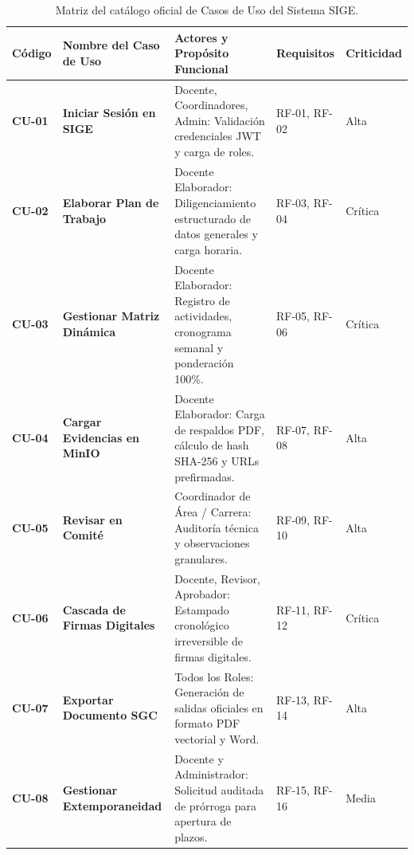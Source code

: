 \documentclass[12pt,a4paper]{article}
\begin{document}
\begin{table}[H]
\centering
\small
\renewcommand{\arraystretch}{1.2}
\begin{tabularx}{\textwidth}{|>{\hsize=0.3\hsize\centering\arraybackslash\footnotesize}X|>{\hsize=1.0\hsize\raggedright\arraybackslash\bfseries\footnotesize}X|>{\hsize=1.8\hsize\raggedright\arraybackslash\footnotesize}X|>{\hsize=0.45\hsize\centering\arraybackslash\footnotesize}X|>{\hsize=0.45\hsize\centering\arraybackslash\footnotesize}X|}
\hline
\rowcolor{tableheader}
\textbf{Código} & \textbf{Nombre del Caso de Uso} & \textbf{Actores y Propósito Funcional} & \textbf{Requisitos} & \textbf{Criticidad} \\
\hline
\textbf{CU-01} & Iniciar Sesión en SIGE & Docente, Coordinadores, Admin: Validación credenciales JWT y carga de roles. & RF-01, RF-02 & Alta \\
\hline
\textbf{CU-02} & Elaborar Plan de Trabajo & Docente Elaborador: Diligenciamiento estructurado de datos generales y carga horaria. & RF-03, RF-04 & Crítica \\
\hline
\textbf{CU-03} & Gestionar Matriz Dinámica & Docente Elaborador: Registro de actividades, cronograma semanal y ponderación 100\%. & RF-05, RF-06 & Crítica \\
\hline
\textbf{CU-04} & Cargar Evidencias en MinIO & Docente Elaborador: Carga de respaldos PDF, cálculo de hash SHA-256 y URLs prefirmadas. & RF-07, RF-08 & Alta \\
\hline
\textbf{CU-05} & Revisar en Comité & Coordinador de Área / Carrera: Auditoría técnica y observaciones granulares. & RF-09, RF-10 & Alta \\
\hline
\textbf{CU-06} & Cascada de Firmas Digitales & Docente, Revisor, Aprobador: Estampado cronológico irreversible de firmas digitales. & RF-11, RF-12 & Crítica \\
\hline
\textbf{CU-07} & Exportar Documento SGC & Todos los Roles: Generación de salidas oficiales en formato PDF vectorial y Word. & RF-13, RF-14 & Alta \\
\hline
\textbf{CU-08} & Gestionar Extemporaneidad & Docente y Administrador: Solicitud auditada de prórroga para apertura de plazos. & RF-15, RF-16 & Media \\
\hline
\end{tabularx}
\caption{Matriz del catálogo oficial de Casos de Uso del Sistema SIGE.}
\label{tab:matriz_casos_uso}
\end{table}
\end{document}
